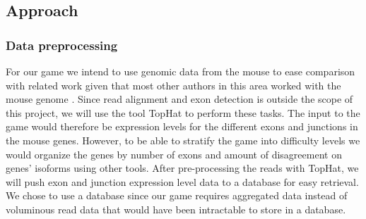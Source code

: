\documentclass[12pt]{article}
\begin{document}
\subsection*{Approach}
\subsubsection*{Data preprocessing}
For our game we intend to use genomic data from the mouse to ease comparison with related work given that most other authors in this area worked with the mouse genome \citep{trapnell2010transcript,guttman2010ab,feng2010inference,li2011isolasso}. Since read alignment and exon detection is outside the scope of this project, we will use the tool TopHat \citep{trapnell2009tophat} to perform these tasks. The input to the game would therefore be expression levels for the different exons and junctions in the mouse genes. 
However, to be able to stratify the game into difficulty levels we would organize the genes by number of exons and amount of disagreement on genes' isoforms using other tools. After pre-processing the reads with TopHat, we will push exon and junction expression level data to a database for easy retrieval. We chose to use a database since our game requires aggregated data instead of voluminous read data that would have been intractable to store in a database.
\end{document}
